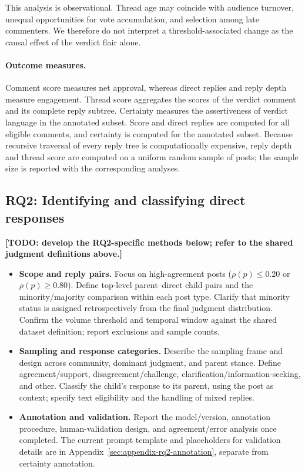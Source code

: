 This analysis is observational. Thread age may coincide with audience turnover,
unequal opportunities for vote accumulation, and selection among late
commenters. We therefore do not interpret a threshold-associated change as the
causal effect of the verdict flair alone.

\paragraph{Outcome measures.}
Comment score measures net approval, whereas direct replies and reply depth
measure engagement. Thread score aggregates the scores of the verdict comment
and its complete reply subtree. Certainty measures the assertiveness of verdict
language in the annotated subset. Score and direct replies are computed for all
eligible comments, and certainty is computed for the annotated subset. Because
recursive traversal of every reply tree is computationally expensive, reply
depth and thread score are computed on a uniform random sample of posts; the
sample size is reported with the corresponding analyses.


\subsection{RQ2: Identifying and classifying direct responses}
\label{subsec:method-rq2}

\textbf{[TODO: develop the RQ2-specific methods below; refer to the shared
judgment definitions above.]}
\begin{itemize}
    \item \textbf{Scope and reply pairs.} Focus on high-agreement posts
    ($\rho(p)\le 0.20$ or $\rho(p)\ge 0.80$). Define top-level parent--direct
    child pairs and the minority/majority comparison within each post type.
    Clarify that minority status is assigned retrospectively from the final
    judgment distribution. Confirm the volume threshold and temporal window
    against the shared dataset definition; report exclusions and sample counts.
    \item \textbf{Sampling and response categories.} Describe the sampling
    frame and design across community, dominant judgment, and parent stance.
    Define agreement/support, disagreement/challenge,
    clarification/information-seeking, and other. Classify the child's response
    to its parent, using the post as context; specify text eligibility and the
    handling of mixed replies.
    \item \textbf{Annotation and validation.} Report the model/version,
    annotation procedure, human-validation design, and agreement/error analysis
    once completed. The current prompt template and placeholders for validation
    details are in Appendix~\ref{sec:appendix-rq2-annotation}, separate from
    certainty annotation.
\end{itemize}
